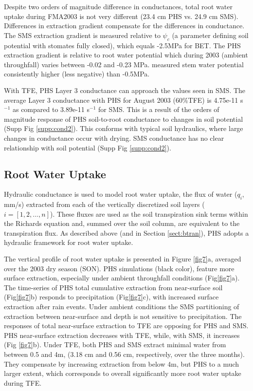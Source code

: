 \documentclass[draft,linenumbers]{agujournal}
\begin{document}
Despite two orders of magnitude difference in conductances, total root water uptake during FMA2003 is not very different (23.4 cm PHS vs. 24.9 cm SMS).
Differences in extraction gradient compensate for the differences in conductance.
The SMS extraction gradient is measured relative to $\psi_c$ (a parameter defining soil potential with stomates fully closed), which equals -2.5MPa for BET.
The PHS extraction gradient is relative to root water potential which during 2003 (ambient throughfall) varies between -0.02 and -0.23 MPa.
\citet{fisher2006} measured stem water potential consistently higher (less negative) than -0.5MPa.

With TFE, PHS Layer 3 conductance can approach the values seen in SMS. 
The average Layer 3 conductance with PHS for August 2003 (60\%TFE) is 4.75e-11 s$^{-1}$ as compared to 3.89e-11 s$^{-1}$ for SMS.
This is a result of the orders of magnitude response of PHS soil-to-root conductance to changes in soil potential (Supp Fig \ref{supp:cond2}). 
This conforms with typical soil hydraulics, where large changes in conductance occur with drying.
SMS conductance has no clear relationship with soil potential (Supp Fig \ref{supp:cond2}). 

\subsection{Root Water Uptake}
\label{sect:rwu}

Hydraulic conductance is used to model root water uptake, the flux of water ($q_i$, mm/s) 
extracted from each of the vertically discretized soil layers ($i=\left[1,2,...,n\right]$).
These fluxes are used as the soil transpiration sink terms within the Richards equation and, summed over the soil column, are equivalent to the transpiration flux.
As described above (and in Section \ref{sect:btran}), PHS adopts a hydraulic framework for root water uptake. 

The vertical profile of root water uptake is presented in Figure \ref{fig7}a, averaged over the 2003 dry season (SON). 
PHS simulations (black color), feature more surface extraction, especially under ambient throughfall conditions (Fig\ref{fig7}a).
The time-series of PHS total cumulative extraction from near-surface soil (Fig\ref{fig7}b) responds to precipitation (Fig\ref{fig7}c), 
with increased surface extraction after rain events.
Under ambient conditions the SMS partitioning of extraction between near-surface and depth is not sensitive to precipitation.
The responses of total near-surface extraction to TFE are opposing for PHS and SMS.
PHS near-surface extraction decreases with TFE, while, with SMS, it increases (Fig \ref{fig7}b).
Under TFE, both PHS and SMS extract minimal water from between 0.5 and 4m, (3.18 cm and 0.56 cm, respectively, over the three months).
They compensate by increasing extraction from below 4m, but PHS to a much larger extent, which corresponds to overall significantly more root water uptake during TFE.
\end{document}
